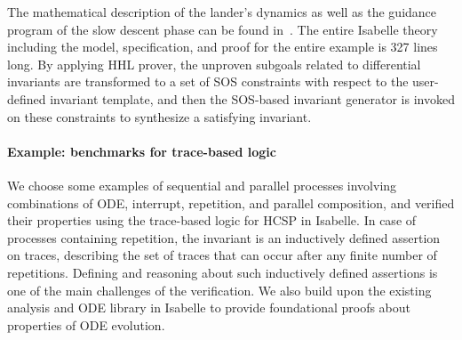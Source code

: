 \documentclass[runningheads,a4paper]{llncs}
\begin{document}
The mathematical description of the lander's dynamics as well as the
guidance program of the slow descent phase can be found
in~\cite{ZYZG14,ZhanWZ16}. The entire Isabelle theory including the
model, specification, and proof for the entire example is 327 lines
long. By applying HHL prover, the unproven subgoals related to
differential invariants are transformed to a set of SOS constraints
with respect to the user-defined invariant template, and then the
SOS-based invariant generator is invoked on these constraints to
synthesize a satisfying invariant.

\paragraph{Example: benchmarks for trace-based logic}

We choose some examples of sequential and parallel processes involving combinations of ODE, interrupt, repetition, and parallel composition, and verified their properties using the trace-based logic for HCSP in Isabelle. In case of processes containing repetition, the invariant is an inductively defined assertion on traces, describing the set of traces that can occur after any finite number of repetitions. Defining and reasoning about such inductively defined assertions is one of the main challenges of the verification. We also build upon the existing analysis and ODE library in Isabelle to provide foundational proofs about properties of ODE evolution.



\end{document}

